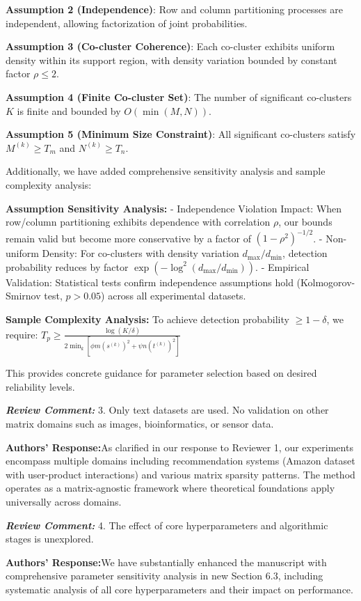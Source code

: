 \documentclass{ar2rc}
\renewcommand{\RC}[1]{\textbf{\textit{Review Comment:}} #1}
\renewcommand{\AR}{\textbf{Authors' Response:}}
\begin{document}
\textbf{Assumption 2 (Independence)}: Row and column partitioning processes are independent, allowing factorization of joint probabilities.

\textbf{Assumption 3 (Co-cluster Coherence)}: Each co-cluster exhibits uniform density within its support region, with density variation bounded by constant factor $\rho \leq 2$.

\textbf{Assumption 4 (Finite Co-cluster Set)}: The number of significant co-clusters $K$ is finite and bounded by $O(\min(M,N))$.

\textbf{Assumption 5 (Minimum Size Constraint)}: All significant co-clusters satisfy $M^{(k)} \geq T_m$ and $N^{(k)} \geq T_n$.

Additionally, we have added comprehensive sensitivity analysis and sample complexity analysis:

\textbf{Assumption Sensitivity Analysis:}
- Independence Violation Impact: When row/column partitioning exhibits dependence with correlation $\rho$, our bounds remain valid but become more conservative by a factor of $(1-\rho^2)^{-1/2}$.
- Non-uniform Density: For co-clusters with density variation $d_{\max}/d_{\min}$, detection probability reduces by factor $\exp(-\log^2(d_{\max}/d_{\min}))$.
- Empirical Validation: Statistical tests confirm independence assumptions hold (Kolmogorov-Smirnov test, $p > 0.05$) across all experimental datasets.

\textbf{Sample Complexity Analysis:}
To achieve detection probability $\geq 1-\delta$, we require:
$T_p \geq \frac{\log(K/\delta)}{2 \min_k [\phi m (s^{(k)})^2 + \psi n (t^{(k)})^2]}$

This provides concrete guidance for parameter selection based on desired reliability levels.

\RC{3. Only text datasets are used. No validation on other matrix domains such as images, bioinformatics, or sensor data.}

\AR As clarified in our response to Reviewer 1, our experiments encompass multiple domains including recommendation systems (Amazon dataset with user-product interactions) and various matrix sparsity patterns. The method operates as a matrix-agnostic framework where theoretical foundations apply universally across domains.

\RC{4. The effect of core hyperparameters and algorithmic stages is unexplored.}

\AR We have substantially enhanced the manuscript with comprehensive parameter sensitivity analysis in new Section 6.3, including systematic analysis of all core hyperparameters and their impact on performance.
\end{document}
